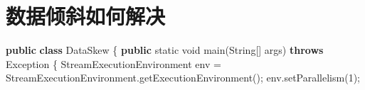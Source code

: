 \documentclass[cn,11pt,chinese]{elegantbook}
\newenvironment{Shaded}{}{}
\newcommand{\BuiltInTok}[1]{#1}
\newcommand{\DataTypeTok}[1]{\textcolor[rgb]{0.56,0.13,0.00}{#1}}
\newcommand{\DecValTok}[1]{\textcolor[rgb]{0.25,0.63,0.44}{#1}}
\newcommand{\FunctionTok}[1]{\textcolor[rgb]{0.02,0.16,0.49}{#1}}
\newcommand{\KeywordTok}[1]{\textcolor[rgb]{0.00,0.44,0.13}{\textbf{#1}}}
\newcommand{\NormalTok}[1]{#1}
\begin{document}
\hypertarget{ux6570ux636eux503eux659cux5982ux4f55ux89e3ux51b3}{%
\section{数据倾斜如何解决}\label{ux6570ux636eux503eux659cux5982ux4f55ux89e3ux51b3}}

\begin{Shaded}
\begin{Highlighting}[]
\KeywordTok{public} \KeywordTok{class}\NormalTok{ DataSkew \{}
    \KeywordTok{public} \DataTypeTok{static} \DataTypeTok{void} \FunctionTok{main}\NormalTok{(}\BuiltInTok{String}\NormalTok{[] args) }\KeywordTok{throws} \BuiltInTok{Exception}\NormalTok{ \{}
\NormalTok{        StreamExecutionEnvironment env = StreamExecutionEnvironment.}\FunctionTok{getExecutionEnvironment}\NormalTok{();}
\NormalTok{        env.}\FunctionTok{setParallelism}\NormalTok{(}\DecValTok{1}\NormalTok{);}


\end{Highlighting}
\end{Shaded}
\end{document}
